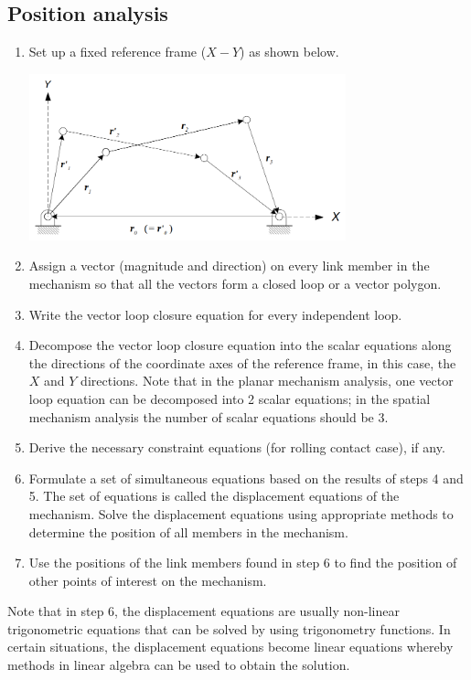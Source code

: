 \documentclass[11pt]{article}
\begin{document}
\subsection{Position analysis}
\label{sec:orge61bc3e}
\begin{enumerate}
\item Set up a fixed reference frame (\(X-Y\)) as shown below.
\begin{center}
\includegraphics[height=13em]{./images/vector-loop-closure.png}
\end{center}
\item Assign a vector (magnitude and direction) on every link member in the mechanism so that all the vectors form a closed loop or a vector polygon.
\item Write the vector loop closure equation for every independent loop.
\item Decompose the vector loop closure equation into the scalar equations along the directions of the coordinate axes of the reference frame, in this case, the \(X\) and \(Y\) directions. Note that in the planar mechanism analysis, one vector loop equation can be decomposed into 2 scalar equations; in the spatial mechanism analysis the number of scalar equations should be 3.
\item Derive the necessary constraint equations (for rolling contact case), if any.
\item Formulate a set of simultaneous equations based on the results of steps 4 and 5. The set of equations is called the displacement equations of the mechanism. Solve the displacement equations using appropriate methods to determine the position of all members in the mechanism.
\item Use the positions of the link members found in step 6 to find the position of other points of interest on the mechanism.
\end{enumerate}

Note that in step 6, the displacement equations are usually non-linear trigonometric equations that can be solved by using trigonometry functions. In certain situations, the displacement equations become linear equations whereby methods in linear algebra can be used to obtain the solution.
\end{document}
